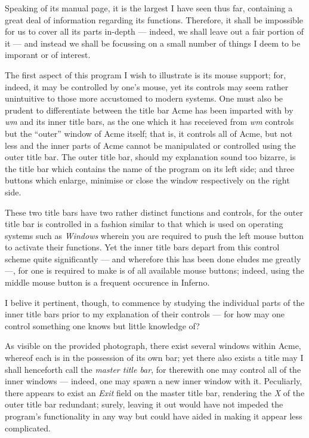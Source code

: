 \documentclass[a5paper,twoside,12pt]{report}
\begin{document}
     Speaking of its manual page, it is the largest I have seen thus far, containing a great deal of information regarding its functions. Therefore, it shall be impossible for us to cover all its parts in-depth — indeed, we shall leave out a fair portion of it — and instead we shall be focussing on a small number of things I deem to be imporant or of interest.

     The first aspect of this program I wish to illustrate is its mouse support; for, indeed, it may be controlled by one's mouse, yet its controls may seem rather unintuitive to those more accustomed to modern systems. One must also be prudent to differentiate between the title bar Acme has been imparted with by \textit{wm} and its inner title bars, as the one which it has receieved from \textit{wm} controls but the ``outer'' window of Acme itself; that is, it controls all of Acme, but not less and the inner parts of Acme cannot be manipulated or controlled using the outer title bar. The outer title bar, should my explanation sound too bizarre, is the title bar which contains the name of the program on its left side; and three buttons which enlarge, minimise or close the window respectively on the right side.

     These two title bars have two rather distinct functions and controls, for the outer title bar is controlled in a fashion similar to that which is used on operating systems such as \textit{Windows} wherein you are required to push the left mouse button to activate their functions. Yet the inner title bars depart from this control scheme quite significantly — and wherefore this has been done eludes me greatly —, for one is required to make is of all available mouse buttons; indeed, using the middle mouse button is a frequent occurence in Inferno.

     I belive it pertinent, though, to commence by studying the individual parts of the inner title bars prior to my explanation of their controls — for how may one control something one knows but little knowledge of?

    As visible on the provided photograph, there exist several windows within Acme, whereof each is in the possession of its own bar; yet there also exists a title may I shall henceforth call the \textit{master title bar}, for therewith one may control all of the inner windows — indeed, one may spawn a new inner window with it. Peculiarly, there appears to exist an \textit {Exit} field on the master title bar, rendering the \textit{X} of the outer title bar redundant; surely, leaving it out would have not impeded the program's functionality in any way but could have aided in making it appear less complicated.
\end{document}
